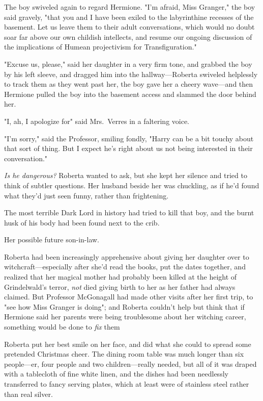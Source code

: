 The boy swiveled again to regard Hermione. "I'm afraid, Miss Granger," the boy
said gravely, "that you and I have been exiled to the labyrinthine recesses of
the basement. Let us leave them to their adult conversations, which would no
doubt soar far above our own childish intellects, and resume our ongoing
discussion of the implications of Humean projectivism for Transfiguration."

"Excuse us, please," said her daughter in a very firm tone, and grabbed the boy
by his left sleeve, and dragged him into the hallway—Roberta swiveled
helplessly to track them as they went past her, the boy gave her a cheery
wave—and then Hermione pulled the boy into the basement access and slammed
the door behind her.

"I, ah, I apologize for{\el}" said Mrs.~Verres in a faltering voice.

"I'm sorry," said the Professor, smiling fondly, "Harry can be a bit touchy
about that sort of thing. But I expect he's right about us not being interested
in their conversation."

\emph{Is he dangerous?} Roberta wanted to ask, but she kept her silence and
tried to think of subtler questions. Her husband beside her was chuckling, as
if he'd found what they'd just seen funny, rather than frightening.

The most terrible Dark Lord in history had tried to kill that boy, and the
burnt husk of his body had been found next to the crib.

Her possible future son-in-law.

Roberta had been increasingly apprehensive about giving her daughter over to
witchcraft—especially after she'd read the books, put the dates together, and
realized that her magical mother had probably been killed at the height of
Grindelwald's terror, \emph{not} died giving birth to her as her father had
always claimed. But Professor McGonagall had made other visits after her first
trip, to "see how Miss Granger is doing"; and Roberta couldn't help but think
that if Hermione said her parents were being troublesome about her witching
career, something would be done to \emph{fix} them{\el}

Roberta put her best smile on her face, and did what she could to spread some
pretended Christmas cheer.
\sbreak
The dining room table was much longer than six people—er, four people and two
children—really needed, but all of it was draped with a tablecloth of fine
white linen, and the dishes had been needlessly transferred to fancy serving
plates, which at least were of stainless steel rather than real silver.

